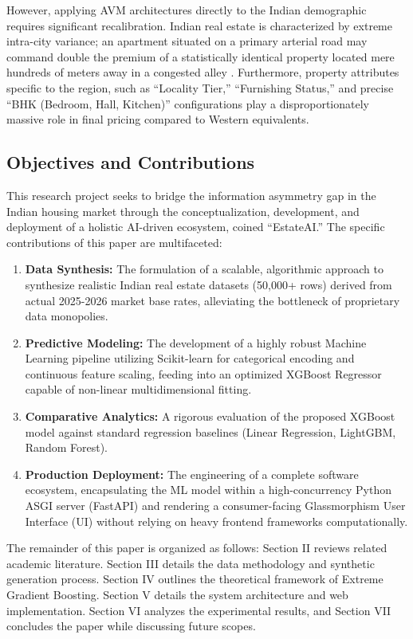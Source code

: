 \documentclass[conference]{IEEEtran}
\begin{document}
However, applying AVM architectures directly to the Indian demographic requires significant recalibration. Indian real estate is characterized by extreme intra-city variance; an apartment situated on a primary arterial road may command double the premium of a statistically identical property located mere hundreds of meters away in a congested alley \cite{khanna}. Furthermore, property attributes specific to the region, such as ``Locality Tier,'' ``Furnishing Status,'' and precise ``BHK (Bedroom, Hall, Kitchen)'' configurations play a disproportionately massive role in final pricing compared to Western equivalents.

\subsection{Objectives and Contributions}
This research project seeks to bridge the information asymmetry gap in the Indian housing market through the conceptualization, development, and deployment of a holistic AI-driven ecosystem, coined ``EstateAI.'' The specific contributions of this paper are multifaceted:
\begin{enumerate}
    \item \textbf{Data Synthesis:} The formulation of a scalable, algorithmic approach to synthesize realistic Indian real estate datasets (50,000+ rows) derived from actual 2025-2026 market base rates, alleviating the bottleneck of proprietary data monopolies.
    \item \textbf{Predictive Modeling:} The development of a highly robust Machine Learning pipeline utilizing Scikit-learn for categorical encoding and continuous feature scaling, feeding into an optimized XGBoost Regressor capable of non-linear multidimensional fitting.
    \item \textbf{Comparative Analytics:} A rigorous evaluation of the proposed XGBoost model against standard regression baselines (Linear Regression, LightGBM, Random Forest).
    \item \textbf{Production Deployment:} The engineering of a complete software ecosystem, encapsulating the ML model within a high-concurrency Python ASGI server (FastAPI) and rendering a consumer-facing Glassmorphism User Interface (UI) without relying on heavy frontend frameworks computationally.
\end{enumerate}

The remainder of this paper is organized as follows: Section II reviews related academic literature. Section III details the data methodology and synthetic generation process. Section IV outlines the theoretical framework of Extreme Gradient Boosting. Section V details the system architecture and web implementation. Section VI analyzes the experimental results, and Section VII concludes the paper while discussing future scopes.
\end{document}
